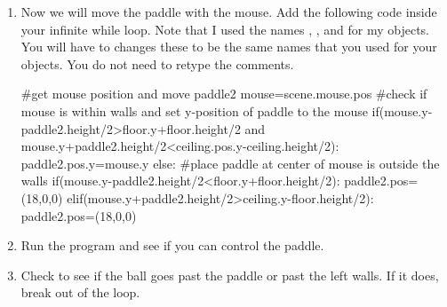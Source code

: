 \begin{enumerate}
\item Now we will move the paddle with the mouse. Add the following code inside your infinite while loop. Note that I used the names , , and  for my objects. You will have to changes these to be the same names that you used for your objects. You do not need to retype the comments.

\begin{myvpython}
        #get mouse position and move paddle2
        mouse=scene.mouse.pos
        #check if mouse is within walls and set y-position of paddle to the mouse
        if(mouse.y-paddle2.height/2>floor.y+floor.height/2 and mouse.y+paddle2.height/2<ceiling.pos.y-ceiling.height/2):
            paddle2.pos.y=mouse.y
        else:
            #place paddle at center of mouse is outside the walls
            if(mouse.y-paddle2.height/2<floor.y+floor.height/2):
                paddle2.pos=(18,0,0)
            elif(mouse.y+paddle2.height/2>ceiling.y-floor.height/2):
                paddle2.pos=(18,0,0)
\end{myvpython}

\item Run the program and see if you can control the paddle.

\item Check to see if the ball goes past the paddle or past the left walls. If it does, break out of the loop.

\end{enumerate}

\vspace{5in}

\pagebreak

\analysis

